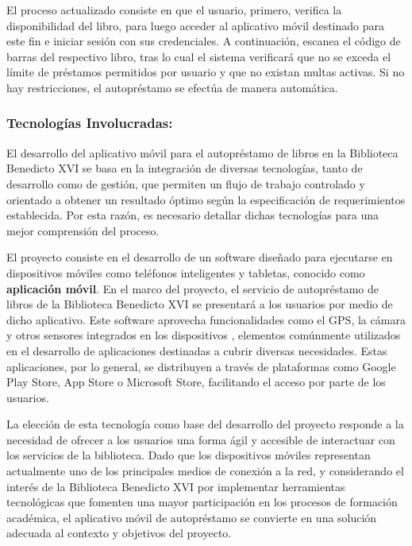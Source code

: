 \documentclass[spanish]{ieee_upb}
\begin{document}
El proceso actualizado consiste en que el usuario, primero, verifica la disponibilidad del libro, para luego acceder al aplicativo móvil destinado para este fin e iniciar sesión con sus credenciales. A continuación, escanea el código de barras del respectivo libro, tras lo cual el sistema verificará que no se exceda el límite de préstamos permitidos por usuario y que no existan multas activas. Si no hay restricciones, el autopréstamo se efectúa de manera automática.


\subsubsection{Tecnologías Involucradas:} El desarrollo del aplicativo móvil para el autopréstamo de libros en la Biblioteca Benedicto XVI se basa en la integración de diversas tecnologías, tanto de desarrollo como de gestión, que permiten un flujo de trabajo controlado y orientado a obtener un resultado óptimo según la especificación de requerimientos establecida. Por esta razón, es necesario detallar dichas tecnologías para una mejor comprensión del proceso.\vspace{0.3 cm}

El proyecto consiste en el desarrollo de un software diseñado para ejecutarse en dispositivos móviles como teléfonos inteligentes y tabletas, conocido como \textbf{aplicación móvil}. En el marco del proyecto, el servicio de autopréstamo de libros de la Biblioteca Benedicto XVI se presentará a los usuarios por medio de dicho aplicativo. Este software aprovecha funcionalidades como el GPS, la cámara y otros sensores integrados en los dispositivos \cite{IBM_mobile_app_development}, elementos comúnmente utilizados en el desarrollo de aplicaciones destinadas a cubrir diversas necesidades. Estas aplicaciones, por lo general, se distribuyen a través de plataformas como Google Play Store, App Store o Microsoft Store, facilitando el acceso por parte de los usuarios.\vspace{0.3 cm}

La elección de esta tecnología como base del desarrollo del proyecto responde a la necesidad de ofrecer a los usuarios una forma ágil y accesible de interactuar con los servicios de la biblioteca. Dado que los dispositivos móviles representan actualmente uno de los principales medios de conexión a la red, y considerando el interés de la Biblioteca Benedicto XVI por implementar herramientas tecnológicas que fomenten una mayor participación en los procesos de formación académica, el aplicativo móvil de autopréstamo se convierte en una solución adecuada al contexto y objetivos del proyecto.\vspace{0.3 cm}
\end{document}
